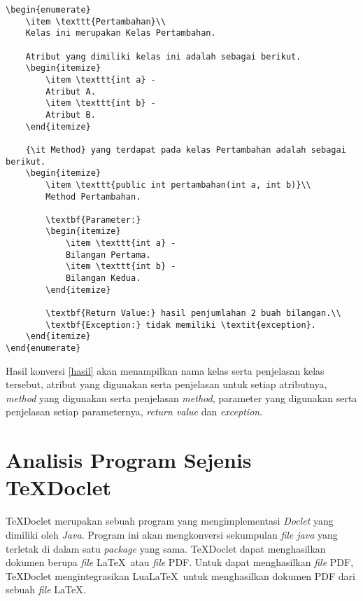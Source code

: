\begin{lstlisting}[caption=Hasil konversi {\it Javadoc} ke \LaTeX, label={hasil}]
\begin{enumerate}
	\item \texttt{Pertambahan}\\
	Kelas ini merupakan Kelas Pertambahan.
	
	Atribut yang dimiliki kelas ini adalah sebagai berikut.
	\begin{itemize}
		\item \texttt{int a} -
		Atribut A.
		\item \texttt{int b} -
		Atribut B.
	\end{itemize}
	
	{\it Method} yang terdapat pada kelas Pertambahan adalah sebagai berikut.
	\begin{itemize}
		\item \texttt{public int pertambahan(int a, int b)}\\
		Method Pertambahan.
		
		\textbf{Parameter:}
		\begin{itemize}
			\item \texttt{int a} - 
			Bilangan Pertama.
			\item \texttt{int b} - 
			Bilangan Kedua.
		\end{itemize}
		
		\textbf{Return Value:} hasil penjumlahan 2 buah bilangan.\\
		\textbf{Exception:} tidak memiliki \textit{exception}.
	\end{itemize}
\end{enumerate}
\end{lstlisting}

Hasil konversi \ref{hasil} akan menampilkan nama kelas serta penjelasan kelas tersebut, atribut yang digunakan serta penjelasan untuk setiap atributnya, {\it method} yang digunakan serta penjelasan {\it method}, parameter yang digunakan serta penjelasan setiap parameternya, {\it return value} dan {\it exception}.

\section{Analisis Program Sejenis TeXDoclet}
\label{sec:texdoclet}
TeXDoclet merupakan sebuah program yang mengimplementasi {\it Doclet} yang dimiliki oleh {\it Java}. Program ini akan mengkonversi sekumpulan {\it file java} yang terletak di dalam satu {\it package} yang sama. TeXDoclet dapat menghasilkan dokumen berupa {\it file} \LaTeX\ atau {\it file} PDF. Untuk dapat menghasilkan {\it file} PDF, TeXDoclet mengintegrasikan Lua\LaTeX\ untuk menghasilkan dokumen PDF dari sebuah {\it file} \LaTeX.

